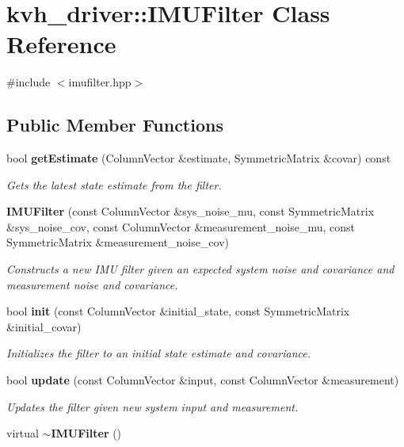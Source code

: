 \section{kvh\-\_\-driver\-:\-:\-I\-M\-U\-Filter \-Class \-Reference}
\label{classkvh__driver_1_1IMUFilter}


{\ttfamily \#include $<$imufilter.\-hpp$>$}

\subsection*{\-Public \-Member \-Functions}
\begin{DoxyCompactItemize}
\item 
bool {\bf get\-Estimate} (\-Column\-Vector \&estimate, \-Symmetric\-Matrix \&covar) const 
\begin{DoxyCompactList}\small\item\em \-Gets the latest state estimate from the filter. \end{DoxyCompactList}\item 
{\bf \-I\-M\-U\-Filter} (const \-Column\-Vector \&sys\-\_\-noise\-\_\-mu, const \-Symmetric\-Matrix \&sys\-\_\-noise\-\_\-cov, const \-Column\-Vector \&measurement\-\_\-noise\-\_\-mu, const \-Symmetric\-Matrix \&measurement\-\_\-noise\-\_\-cov)
\begin{DoxyCompactList}\small\item\em \-Constructs a new \-I\-M\-U filter given an expected system noise and covariance and measurement noise and covariance. \end{DoxyCompactList}\item 
bool {\bf init} (const \-Column\-Vector \&initial\-\_\-state, const \-Symmetric\-Matrix \&initial\-\_\-covar)
\begin{DoxyCompactList}\small\item\em \-Initializes the filter to an initial state estimate and covariance. \end{DoxyCompactList}\item 
bool {\bf update} (const \-Column\-Vector \&input, const \-Column\-Vector \&measurement)
\begin{DoxyCompactList}\small\item\em \-Updates the filter given new system input and measurement. \end{DoxyCompactList}\item 
virtual {\bf $\sim$\-I\-M\-U\-Filter} ()
\end{DoxyCompactItemize}
